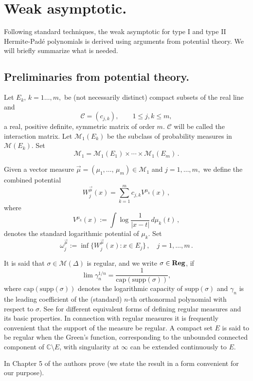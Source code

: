 \documentclass{amsart}
\theoremstyle{definition}
\theoremstyle{remark}
\begin{document}
\section{Weak asymptotic.}

Following standard techniques,  the weak asymptotic for type I and type II Hermite-Pad\'e polynomials is derived using arguments from potential theory. We will briefly summarize what is needed.

\subsection{Preliminaries from potential theory.}

Let $E_k,\, k=1\ldots,m,$ be (not necessarily distinct)
compact subsets of the real line and
\[ \mathcal{C} = (c_{j,k}), \qquad
1\leq j,k \leq m,
\] a real, positive definite, symmetric
matrix of order $m$. $\mathcal{C}$ will be called the
interaction matrix. Let
$\mathcal{M}_1(E_k) $ be the subclass of probability measures in
$\mathcal{M}(E_k).$ Set
\[\mathcal{M}_1= \mathcal{M}_1(E_{1})
\times \cdots \times \mathcal{M}_1(E_{m})  \,.
\]

Given a vector measure $\vec{\mu}=(\mu_{1},\ldots,\,\mu_{m}) \in
\mathcal{M}_1$ and $j= 1,\ldots,m,$ we define the combined
potential
\[W^{\vec{\mu}}_j(x) = \sum_{k=1}^{m} c_{j,k}
V^{\mu_k}(x) \,,
\]
where
\[ V^{\mu_k}(x) := \int \log \frac{1}{|x-t|} \,d\mu_k(t)\,,
\]
denotes the standard logarithmic potential of $\mu_k$. Set
\[ \omega_j^{\vec{\mu}} := \inf \{W_j^{\vec{\mu}}(x): x \in E_j\} \,, \quad
j=1,\ldots,m\,.
\]

It is said that $\sigma \in \mathcal{M}(\Delta)$ is regular, and we write $\sigma \in \mbox{\bf Reg}$, if
\[ \lim \gamma_n^{1/n} = \frac{1}{\mbox{cap}(\mbox{supp}(\sigma))},
\]
where $\mbox{cap}(\mbox{supp}(\sigma) )$ denotes the logarithmic capacity of $\mbox{supp}(\sigma)$ and $\gamma_n$ is the leading coefficient of the (standard) $n$-th orthonormal polynomial with respect to $\sigma$. See \cite[Theorems 3.1.1, 3.2.1]{stto} for different equivalent forms of defining regular measures and its basic properties. In connection with regular measures it is frequently convenient that the support of the measure be regular. A compact set $E$ is said to be regular when the Green's function, corresponding to the unbounded connected component of $\mathbb{C} \setminus E$, with singularity at $\infty$ can be extended continuously to $E$.

In Chapter 5 of \cite{NiSo}  the authors prove (we state the
result in a form convenient for our purpose).
\end{document}
